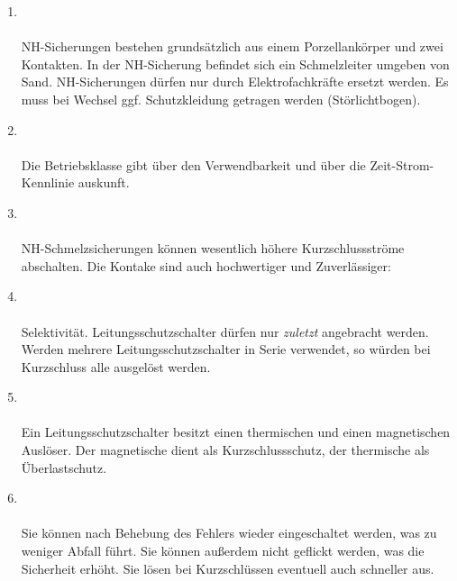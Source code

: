 \begin{enumerate}
    \item   {} \\\\
            NH-Sicherungen bestehen grundsätzlich aus einem Porzellankörper und zwei Kontakten. In der NH-Sicherung befindet sich ein Schmelzleiter umgeben von Sand.
            NH-Sicherungen dürfen nur durch Elektrofachkräfte ersetzt werden. Es muss bei Wechsel ggf. Schutzkleidung getragen werden (Störlichtbogen).

    \item   {} \\\\
            Die Betriebsklasse gibt über den Verwendbarkeit und über die Zeit-Strom-Kennlinie auskunft.

    \item   {} \\\\
            NH-Schmelzsicherungen können wesentlich höhere Kurzschlussströme abschalten. Die Kontake sind auch hochwertiger und Zuverlässiger:


    \item   {} \\\\
            Selektivität. Leitungsschutzschalter dürfen nur \textit{zuletzt} angebracht werden. Werden mehrere Leitungsschutzschalter in Serie verwendet,
            so würden bei Kurzschluss alle ausgelöst werden.

    \item   {}\\\\
            Ein Leitungsschutzschalter besitzt einen thermischen und einen magnetischen Auslöser. Der magnetische dient als Kurzschlussschutz, der thermische als 
            Überlastschutz.

    \item   {}\\\\
            Sie können nach Behebung des Fehlers wieder eingeschaltet werden, was zu weniger Abfall führt. Sie können außerdem nicht geflickt werden,
            was die Sicherheit erhöht. Sie lösen bei Kurzschlüssen eventuell auch schneller aus.


\end{enumerate}
